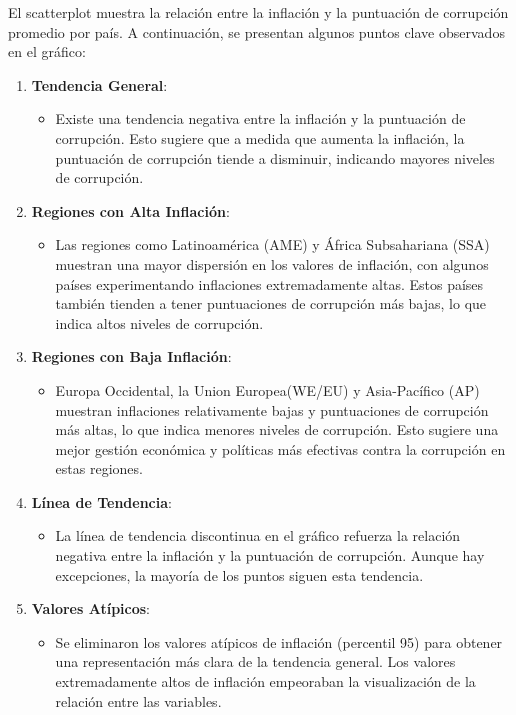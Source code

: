 \documentclass[
]{article}
\providecommand{\tightlist}{%
  \setlength{\itemsep}{0pt}\setlength{\parskip}{0pt}}
\begin{document}
El scatterplot muestra la relación entre la inflación y la puntuación de
corrupción promedio por país. A continuación, se presentan algunos
puntos clave observados en el gráfico:

\begin{enumerate}
\def\labelenumi{\arabic{enumi}.}
\tightlist
\item
  \textbf{Tendencia General}:

  \begin{itemize}
  \tightlist
  \item
    Existe una tendencia negativa entre la inflación y la puntuación de
    corrupción. Esto sugiere que a medida que aumenta la inflación, la
    puntuación de corrupción tiende a disminuir, indicando mayores
    niveles de corrupción.
  \end{itemize}
\item
  \textbf{Regiones con Alta Inflación}:

  \begin{itemize}
  \tightlist
  \item
    Las regiones como Latinoamérica (AME) y África Subsahariana (SSA)
    muestran una mayor dispersión en los valores de inflación, con
    algunos países experimentando inflaciones extremadamente altas.
    Estos países también tienden a tener puntuaciones de corrupción más
    bajas, lo que indica altos niveles de corrupción.
  \end{itemize}
\item
  \textbf{Regiones con Baja Inflación}:

  \begin{itemize}
  \tightlist
  \item
    Europa Occidental, la Union Europea(WE/EU) y Asia-Pacífico (AP)
    muestran inflaciones relativamente bajas y puntuaciones de
    corrupción más altas, lo que indica menores niveles de corrupción.
    Esto sugiere una mejor gestión económica y políticas más efectivas
    contra la corrupción en estas regiones.
  \end{itemize}
\item
  \textbf{Línea de Tendencia}:

  \begin{itemize}
  \tightlist
  \item
    La línea de tendencia discontinua en el gráfico refuerza la relación
    negativa entre la inflación y la puntuación de corrupción. Aunque
    hay excepciones, la mayoría de los puntos siguen esta tendencia.
  \end{itemize}
\item
  \textbf{Valores Atípicos}:

  \begin{itemize}
  \tightlist
  \item
    Se eliminaron los valores atípicos de inflación (percentil 95) para
    obtener una representación más clara de la tendencia general. Los
    valores extremadamente altos de inflación empeoraban la
    visualización de la relación entre las variables.
  \end{itemize}
\end{enumerate}
\end{document}

